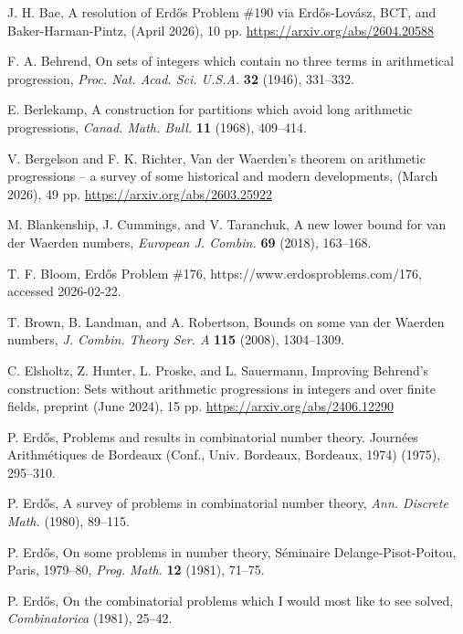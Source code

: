 \documentclass[11pt]{article}
\numberwithin{equation}{section}
\theoremstyle{definition}
\theoremstyle{remark}
\begin{document}
\begin{thebibliography}{}


 J. H. Bae, A resolution of Erd\H{o}s Problem \#190 via Erd\H{o}s-Lov\'asz, BCT, and Baker-Harman-Pintz, (April 2026), 10 pp. \url{https://arxiv.org/abs/2604.20588}

 F. A. Behrend, On sets of integers which contain no three terms in arithmetical progression, {\it Proc. Nat. Acad. Sci. U.S.A.} {\bf 32} (1946), 331--332.

 E. Berlekamp, A construction for partitions which avoid long arithmetic progressions, {\it Canad. Math. Bull.} {\bf 11} (1968), 409--414.


 V. Bergelson and F. K. Richter, Van der Waerden's theorem on arithmetic progressions -- a survey of some historical and modern developments, (March 2026), 49 pp. \url{https://arxiv.org/abs/2603.25922}

 M. Blankenship, J. Cummings, and V. Taranchuk, A new lower bound for van der Waerden numbers, {\it European
J. Combin.} {\bf 69} (2018), 163--168.

 T. F. Bloom, Erdős Problem \#176, https://www.erdosproblems.com/176, accessed 2026-02-22.

 T. Brown, B. Landman, and A. Robertson, 
Bounds on some van der Waerden numbers, {\it J. Combin. Theory Ser. A} {\bf 115} (2008), 1304--1309. 

 C. Elsholtz, Z. Hunter, L. Proske, and L. Sauermann, Improving Behrend's construction: Sets without arithmetic progressions in integers and over finite fields, preprint (June 2024), 15 pp. \url{https://arxiv.org/abs/2406.12290}

 P. Erd\H{o}s, Problems and results in combinatorial number theory. Journ\'ees Arithmétiques de Bordeaux (Conf., Univ. Bordeaux, Bordeaux, 1974) (1975), 295--310.

 P. Erd\H{o}s, A survey of problems in combinatorial number theory, {\it Ann. Discrete Math.} (1980), 89--115.

 P. Erd\H{o}s, On some problems in number theory, S\'eminaire Delange-Pisot-Poitou, Paris, 1979--80, {\it Prog. Math.} {\bf 12} (1981), 71--75.

 P. Erd\H{o}s, On the combinatorial problems which I would most like to see solved, {\it Combinatorica} (1981), 25--42. 


\end{thebibliography}
\end{document}
